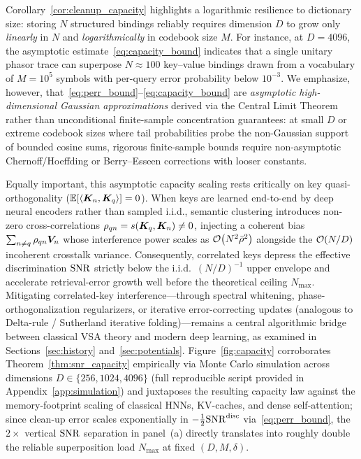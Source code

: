 Corollary~\ref{cor:cleanup_capacity} highlights a logarithmic resilience to dictionary size: storing $N$ structured bindings reliably requires dimension $D$ to grow only \emph{linearly} in $N$ and \emph{logarithmically} in codebook size $M$.
For instance, at $D = 4096$, the asymptotic estimate~\eqref{eq:capacity_bound} indicates that a single unitary phasor trace can superpose $N \approx 100$ key--value bindings drawn from a vocabulary of $M = 10^5$ symbols with per-query error probability below $10^{-3}$.
We emphasize, however, that~\eqref{eq:perr_bound}--\eqref{eq:capacity_bound} are \emph{asymptotic high-dimensional Gaussian approximations} derived via the Central Limit Theorem rather than unconditional finite-sample concentration guarantees: at small $D$ or extreme codebook sizes where tail probabilities probe the non-Gaussian support of bounded cosine sums, rigorous finite-sample bounds require non-asymptotic Chernoff/Hoeffding or Berry--Esseen corrections with looser constants.

Equally important, this asymptotic capacity scaling rests critically on key quasi-orthogonality ($\mathbb{E}[\left\langle \boldsymbol{K}_n, \boldsymbol{K}_q \right\rangle] = 0$).
When keys are learned end-to-end by deep neural encoders rather than sampled i.i.d., semantic clustering introduces non-zero cross-correlations $\rho_{qn} = s(\boldsymbol{K}_q, \boldsymbol{K}_n) \neq 0$, injecting a coherent bias $\sum_{n \neq q} \rho_{qn} \boldsymbol{V}_n$ whose interference power scales as $\mathcal{O}\!\left(N^2 \bar{\rho}^2\right)$ alongside the $\mathcal{O}\!\left(N/D\right)$ incoherent crosstalk variance.
Consequently, correlated keys depress the effective discrimination $\mathrm{SNR}$ strictly below the i.i.d.\ $(N/D)^{-1}$ upper envelope and accelerate retrieval-error growth well before the theoretical ceiling $N_{\max}$.
Mitigating correlated-key interference---through spectral whitening, phase-orthogonalization regularizers, or iterative error-correcting updates (analogous to Delta-rule / Sutherland iterative folding)---remains a central algorithmic bridge between classical VSA theory and modern deep learning, as examined in Sections~\ref{sec:history} and~\ref{sec:potentials}.
Figure~\ref{fig:capacity} corroborates Theorem~\ref{thm:snr_capacity} empirically via Monte Carlo simulation across dimensions $D \in \{256, 1024, 4096\}$ (full reproducible script provided in Appendix~\ref{app:simulation}) and juxtaposes the resulting capacity law against the memory-footprint scaling of classical HNNs, KV-caches, and dense self-attention; since clean-up error scales exponentially in $-\frac{1}{2}\mathrm{SNR}^{\mathrm{disc}}$ via~\eqref{eq:perr_bound}, the $2\times$ vertical $\mathrm{SNR}$ separation in panel~(a) directly translates into roughly double the reliable superposition load $N_{\max}$ at fixed $(D, M, \delta)$.


